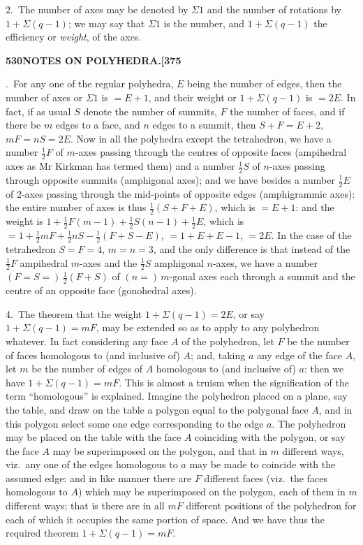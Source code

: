 \documentclass[11pt,a4paper]{article}
\begin{document}
2.~The number of axes may be denoted by $\Sigma 1$ and the number of rotations by $1 + \Sigma(q - 1)$; we may say that $\Sigma 1$ is the number, and $1 + \Sigma(q - 1)$ the efficiency or \textit{weight}, of the axes.

\newpage
\noindent\textbf{530\hspace{1em}NOTES ON POLYHEDRA.\hfill[375}

\vspace{12pt}

.~For any one of the regular polyhedra, $E$ being the number of edges, then the number of axes or $\Sigma 1$ is $= E + 1$, and their weight or $1 + \Sigma(q - 1)$ is $= 2E$. In fact, if as usual $S$ denote the number of summits, $F$ the number of faces, and if there be $m$ edges to a face, and $n$ edges to a summit, then $S + F = E + 2$, $mF = nS = 2E$. Now in all the polyhedra except the tetrahedron, we have a number $\tfrac{1}{2}F$ of $m$-axes passing through the centres of opposite faces (ampihedral axes as Mr Kirkman has termed them) and a number $\tfrac{1}{2}S$ of $n$-axes passing through opposite summits (amphigonal axes); and we have besides a number $\tfrac{1}{2}E$ of 2-axes passing through the mid-points of opposite edges (amphigrammic axes): the entire number of axes is thus $\tfrac{1}{2}(S + F + E)$, which is $= E + 1$: and the weight is $1 + \tfrac{1}{2}F(m - 1) + \tfrac{1}{2}S(n - 1) + \tfrac{1}{2}E$, which is $= 1 + \tfrac{1}{2}mF + \tfrac{1}{2}nS - \tfrac{1}{2}(F + S - E)$, $= 1 + E + E - 1$, $= 2E$. In the case of the tetrahedron $S = F = 4$, $m = n = 3$, and the only difference is that instead of the $\tfrac{1}{2}F$ ampihedral $m$-axes and the $\tfrac{1}{2}S$ amphigonal $n$-axes, we have a number $(F = S =)\,\tfrac{1}{2}(F + S)$ of $(n =)\,m$-gonal axes each through a summit and the centre of an opposite face (gonohedral axes).

4.~The theorem that the weight $1 + \Sigma(q - 1) = 2E$, or say $1 + \Sigma(q - 1) = mF$, may be extended so as to apply to any polyhedron whatever. In fact considering any face $A$ of the polyhedron, let $F$ be the number of faces homologous to (and inclusive of) $A$; and, taking $a$ any edge of the face $A$, let $m$ be the number of edges of $A$ homologous to (and inclusive of) $a$: then we have $1 + \Sigma(q - 1) = mF$. This is almost a truism when the signification of the term ``homologous'' is explained. Imagine the polyhedron placed on a plane, say the table, and draw on the table a polygon equal to the polygonal face $A$, and in this polygon select some one edge corresponding to the edge $a$. The polyhedron may be placed on the table with the face $A$ coinciding with the polygon, or say the face $A$ may be superimposed on the polygon, and that in $m$ different ways, viz.~any one of the edges homologous to $a$ may be made to coincide with the assumed edge: and in like manner there are $F$ different faces (viz.~the faces homologous to $A$) which may be superimposed on the polygon, each of them in $m$ different ways; that is there are in all $mF$ different positions of the polyhedron for each of which it occupies the same portion of space. And we have thus the required theorem $1 + \Sigma(q - 1) = mF$.
\end{document}
